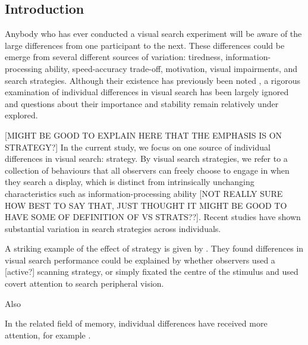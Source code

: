 \documentclass[]{rsos}%
\begin{document}
\begin{fmtext}
\section{Introduction}
Anybody who has ever conducted a visual search experiment will be aware of the large differences from one participant to the next. These differences could be emerge from several different sources of variation: tiredness\cite{mackworth1948}, information-processing ability, speed-accuracy trade-off, motivation, visual impairments, and search strategies\cite{boot2006}. Although their existence has previously been noted \cite{mackworth1948}, a rigorous examination of individual differences in visual search has been largely ignored and questions about their importance and stability remain relatively under explored. 

[MIGHT BE GOOD TO EXPLAIN HERE THAT THE EMPHASIS IS ON STRATEGY?] In the current study, we focus on one source of individual differences in visual search: strategy. By visual search strategies, we refer to a collection of behaviours that all observers can freely choose to engage in when they search a display, which is distinct from intrinsically unchanging characteristics such as information-processing ability [NOT REALLY SURE HOW BEST TO SAY THAT, JUST THOUGHT IT MIGHT BE GOOD TO HAVE SOME OF DEFINITION OF VS STRATS??]. Recent studies have shown substantial variation in search strategies across individuals. 

A striking example of the effect of strategy is given by \cite{boot2006, boot2009}. They found differences in visual search performance could be explained by whether observers used a [active?] scanning strategy, or simply fixated the centre of the stimulus and used covert attention to search peripheral vision. 

Also \cite{proulx2011}

In the related field of memory, individual differences have received more attention, for example \cite{sobel2007}. 



\end{fmtext}
\end{document}
